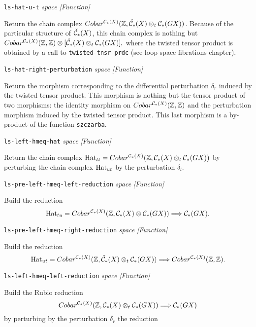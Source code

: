 {{\leftskip=5mm
{\tt ls-hat-u-t} {\em space}  \hfill {\em [Function]} \par}
{\leftskip=15mm
Return the chain complex
$Cobar^{{\cal C}_*(X)}(\mathbb{Z},{\check{\cal C}}_*(X)\otimes_t {\cal C_*}(GX))$. Because of
the particular structure of ${\check{\cal C}}_*(X)$, this chain complex is nothing but
$Cobar^{{\cal C}_*(X)}(\mathbb{Z},\mathbb{Z})\otimes[{\check{\cal C}}_*(X)\otimes_t {\cal C_*}(GX)],$
where the twisted tensor product is obtained by a call to {\tt twisted-tnsr-prdc}
(see loop space fibrations chapter). \par}
{\leftskip=5mm
{\tt ls-hat-right-perturbation} {\em space}  \hfill {\em [Function]} \par}
{\leftskip=15mm
Return the morphism corresponding to the differential perturbation $\delta_r$ induced
by the twisted tensor product. This morphism is nothing but the tensor product of two
morphisms: the identity morphism on $Cobar^{{\cal C}_*(X)}(\mathbb{Z},\mathbb{Z})$ and
the perturbation morphism induced by the twisted tensor product. This last
morphism is a by-product of the function {\tt szczarba}. \par}
{\leftskip=5mm
{\tt ls-left-hmeq-hat} {\em space}  \hfill {\em [Function]} \par}
{\leftskip=15mm
Return the chain complex
${\rm Hat}_{tt}=Cobar^{{\cal C}_*(X)}(\mathbb{Z}, {\cal C}_*(X)\otimes_t {\cal C_*}(GX))$ by
perturbing the chain complex ${\rm Hat}_{ut}$ by the perturbation $\delta_l$. \par}
{\leftskip=5mm
{\tt ls-pre-left-hmeq-left-reduction} {\em space}  \hfill {\em [Function]} \par}
{\leftskip=15mm
Build the reduction
$${\rm Hat}_{tu}=Cobar^{{\cal C}_*(X)}(\mathbb{Z}, {\cal C}_*(X)\otimes {\cal C_*}(GX)) \Longrightarrow {\cal C}_*(GX).$$
\par}
{\leftskip=5mm
{\tt ls-pre-left-hmeq-right-reduction} {\em space}  \hfill {\em [Function]} \par}
{\leftskip=15mm
Build the reduction
$${\rm Hat}_{ut}=Cobar^{{\cal C}_*(X)}(\mathbb{Z},{\check{\cal C}}_*(X)\otimes_t {\cal C_*}(GX)) \Longrightarrow
Cobar^{{\cal C}_*(X)}(\mathbb{Z}, \mathbb{Z}).$$ \par}
{\leftskip=5mm
{\tt ls-left-hmeq-left-reduction} {\em space}  \hfill {\em [Function]} \par}
{\leftskip=15mm
Build the Rubio reduction
$$Cobar^{{\cal C}_*(X)}(\mathbb{Z}, {\cal C}_*(X)\otimes_t {\cal C_*}(GX)) \Longrightarrow{\cal C}_*(GX)$$
by perturbing by the perturbation $\delta_r$ the reduction
}}
